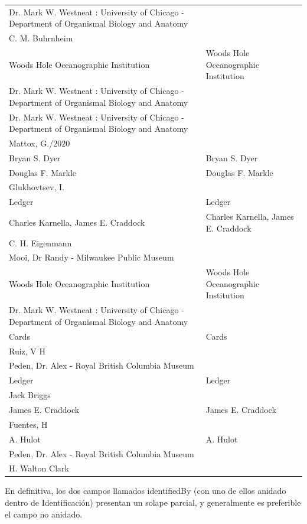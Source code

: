 \documentclass[sn-apa,pdflatex]{sn-jnl}
\begin{document}
\begin{longtable}[t]{>{\raggedright\arraybackslash}p{25em}>{\raggedright\arraybackslash}p{25em}}
\addlinespace
Dr. Mark W. Westneat : University of Chicago - Department of Organismal Biology and Anatomy \vphantom{3} & \\
C. M. Buhrnheim & \\
Woods Hole Oceanographic Institution & Woods Hole Oceanographic \vphantom{1} Institution\\
Dr. Mark W. Westneat : University of Chicago - Department of Organismal Biology and Anatomy \vphantom{2} & \\
Dr. Mark W. Westneat : University of Chicago - Department of Organismal Biology and Anatomy \vphantom{1} & \\
\addlinespace
Mattox, G./2020 & \\
Bryan S. Dyer & Bryan S. Dyer\\
Douglas F. Markle & Douglas F. Markle\\
Glukhovtsev, I. & \\
Ledger & \vphantom{1} Ledger\\
\addlinespace
Charles Karnella, James E. Craddock & Charles Karnella, James E. Craddock\\
C. H. Eigenmann & \\
Mooi, Dr Randy - Milwaukee Public Museum & \\
Woods Hole Oceanographic Institution & Woods Hole Oceanographic Institution\\
Dr. Mark W. Westneat : University of Chicago - Department of Organismal Biology and Anatomy & \\
\addlinespace
Cards & Cards\\
Ruiz, V H & \\
Peden, Dr. Alex - Royal British Columbia Museum \vphantom{1} & \\
Ledger & Ledger\\
Jack Briggs & \\
\addlinespace
James E. Craddock & James E. Craddock\\
Fuentes, H & \\
A. Hulot & A. Hulot\\
Peden, Dr. Alex - Royal British Columbia Museum & \\
H. Walton Clark & \\
\bottomrule
\end{longtable}
\endgroup{}

En definitiva, los dos campos llamados identifiedBy (con uno de ellos
anidado dentro de Identificación) presentan un solape parcial, y
generalmente es preferible el campo no anidado.
\end{document}
